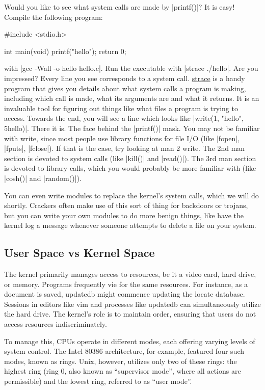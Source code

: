 \documentclass[10pt, oneside]{book}
\begin{document}
Would you like to see what system calls are made by \cpp|printf()|?
It is easy!
Compile the following program:

\begin{code}
#include <stdio.h>

int main(void)
{
    printf("hello");
    return 0;
}
\end{code}

with \sh|gcc -Wall -o hello hello.c|.
Run the executable with \sh|strace ./hello|.
Are you impressed?
Every line you see corresponds to a system call.
\href{https://strace.io/}{strace} is a handy program that gives you details about what system calls a program is making, including which call is made, what its arguments are and what it returns.
It is an invaluable tool for figuring out things like what files a program is trying to access.
Towards the end, you will see a line which looks like \cpp|write(1, "hello", 5hello)|.
There it is.
The face behind the \cpp|printf()| mask.
You may not be familiar with write, since most people use library functions for file I/O (like \cpp|fopen|, \cpp|fputs|, \cpp|fclose|).
If that is the case, try looking at man 2 write.
The 2nd man section is devoted to system calls (like \cpp|kill()| and \cpp|read()|).
The 3rd man section is devoted to library calls, which you would probably be more familiar with (like \cpp|cosh()| and \cpp|random()|).

You can even write modules to replace the kernel's system calls, which we will do shortly.
Crackers often make use of this sort of thing for backdoors or trojans, but you can write your own modules to do more benign things, like have the kernel log a message whenever someone attempts to delete a file on your system.

\subsection{User Space vs Kernel Space}
\label{sec:user_kernl_space}
The kernel primarily manages access to resources, be it a video card, hard drive, or memory.
Programs frequently vie for the same resources.
For instance, as a document is saved, updatedb might commence updating the locate database.
Sessions in editors like vim and processes like updatedb can simultaneously utilize the hard drive.
The kernel's role is to maintain order, ensuring that users do not access resources indiscriminately.

To manage this, CPUs operate in different modes, each offering varying levels of system control.
The Intel 80386 architecture, for example, featured four such modes, known as rings.
Unix, however, utilizes only two of these rings: the highest ring (ring 0, also known as ``supervisor mode'',
where all actions are permissible) and the lowest ring, referred to as ``user mode''.
\end{document}
